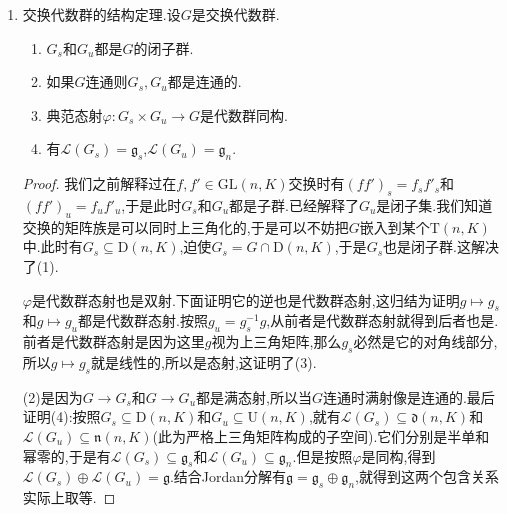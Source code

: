 \begin{enumerate}
\begin{proof}
    	任取代数群态射$\varphi:G\to G'$,它分解为满态射$G\to\varphi(G)$和单态射$\varphi(G)\to G'$.于是问题归结为证明$\varphi$是单态射和满态射的情况.如果$\varphi$是单射,按照上一段相同的做法就得证.下面设$\varphi$是满态射.此时$R_{\varphi(g)}$是$R_g$在子环$K[G']\subseteq K[G]$上的限制.所以从$g$是半单元/幂单元就得到它在子空间上的限制$\varphi(g)$是半单元/幂单元.于是分解$R_{\varphi(g)}=R_{\varphi(g_s)}R_{\varphi(g_u)}$就已经是$R_{\varphi(g)}$的Jordan分解.于是$\varphi(g_s)=\varphi(g)_s$和$\varphi(g_u)=\varphi(g)_u$.李代数的部分是类似的.
    \end{proof}
    \item 交换代数群的结构定理.设$G$是交换代数群.
    \begin{enumerate}[(1)]
    	\item $G_s$和$G_u$都是$G$的闭子群.
    	\item 如果$G$连通则$G_s,G_u$都是连通的.
    	\item 典范态射$\varphi:G_s\times G_u\to G$是代数群同构.
    	\item 有$\mathscr{L}(G_s)=\mathfrak{g}_s$,$\mathscr{L}(G_u)=\mathfrak{g}_n$.
    \end{enumerate}
    \begin{proof}
    	
    	我们之前解释过在$f,f'\in\mathrm{GL}(n,K)$交换时有$(ff')_s=f_sf'_s$和$(ff')_u=f_uf'_u$,于是此时$G_s$和$G_u$都是子群.已经解释了$G_u$是闭子集.我们知道交换的矩阵族是可以同时上三角化的,于是可以不妨把$G$嵌入到某个$\mathrm{T}(n,K)$中.此时有$G_s\subseteq\mathrm{D}(n,K)$,迫使$G_s=G\cap\mathrm{D}(n,K)$,于是$G_s$也是闭子群.这解决了(1).
    	
    	\qquad
    	
    	$\varphi$是代数群态射也是双射.下面证明它的逆也是代数群态射,这归结为证明$g\mapsto g_s$和$g\mapsto g_u$都是代数群态射.按照$g_u=g_s^{-1}g$,从前者是代数群态射就得到后者也是.前者是代数群态射是因为这里$g$视为上三角矩阵,那么$g_s$必然是它的对角线部分,所以$g\mapsto g_s$就是线性的,所以是态射,这证明了(3).
    	
    	\qquad
    	
    	(2)是因为$G\to G_s$和$G\to G_u$都是满态射,所以当$G$连通时满射像是连通的.最后证明(4):按照$G_s\subseteq\mathrm{D}(n,K)$和$G_u\subseteq\mathrm{U}(n,K)$,就有$\mathscr{L}(G_s)\subseteq\mathfrak{d}(n,K)$和$\mathscr{L}(G_u)\subseteq\mathfrak{n}(n,K)$(此为严格上三角矩阵构成的子空间).它们分别是半单和幂零的,于是有$\mathscr{L}(G_s)\subseteq\mathfrak{g}_s$和$\mathscr{L}(G_u)\subseteq\mathfrak{g}_n$.但是按照$\varphi$是同构,得到$\mathscr{L}(G_s)\oplus\mathscr{L}(G_u)=\mathfrak{g}$.结合Jordan分解有$\mathfrak{g}=\mathfrak{g}_s\oplus\mathfrak{g}_n$,就得到这两个包含关系实际上取等.
    \end{proof}
\end{enumerate}
